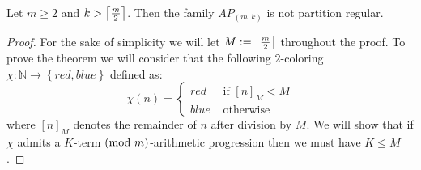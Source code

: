 \begin{theorem}
	Let $m \geq 2$ and $k > \left\lceil\frac{m}{2}\right\rceil$. Then the family $AP_{(m, k)}$ is not partition regular.
\end{theorem}
\begin{proof}
	For the sake of simplicity we will let $M := \left\lceil\frac{m}{2}\right\rceil$ throughout the proof. To prove the theorem we will consider that the following $2$-coloring $\chi: \mathbb{N} \to \left\{red, blue\right\}$ defined as:
	\begin{equation*}
		\chi(n) = \begin{cases}
			red  & \text{ if } [n]_{M} < M \\
			blue & \text{ otherwise }
		\end{cases}
	\end{equation*}
	where $[n]_{M}$ denotes the remainder of $n$ after division by $M$. We will show that if $\chi$ admits a $K$-term $(\textnormal{mod } m)$-arithmetic progression then we must have $K \leq M$.


\end{proof}
